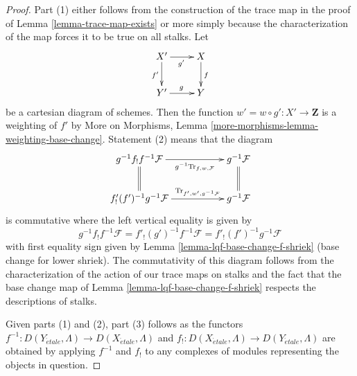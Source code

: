 \documentclass{stacks-project}
\theoremstyle{plain}
\theoremstyle{definition}
\theoremstyle{remark}
\numberwithin{equation}{subsection}
\def\etale{{\acute{e}tale}}
\begin{document}
\begin{proof}
Part (1) either follows from the construction of the trace map
in the proof of Lemma \ref{lemma-trace-map-exists}
or more simply because the characterization of the map
forces it to be true on all stalks.
Let
$$
\xymatrix{
X' \ar[r]_{g'} \ar[d]_{f'} & X \ar[d]^f \\
Y' \ar[r]^g & Y
}
$$
be a cartesian diagram of schemes. Then the function
$w' = w \circ g' : X' \to \mathbf{Z}$ is a weighting of $f'$ by
More on Morphisms, Lemma \ref{more-morphisms-lemma-weighting-base-change}.
Statement (2) means that the diagram
$$
\xymatrix{
g^{-1}f_!f^{-1}\mathcal{F}
\ar[rr]_-{g^{-1}\text{Tr}_{f, w, \mathcal{F}}} \ar@{=}[d] & &
g^{-1}\mathcal{F} \ar@{=}[d] \\
f'_!(f')^{-1}g^{-1}\mathcal{F}
\ar[rr]^-{\text{Tr}_{f', w', g^{-1}\mathcal{F}}} & &
g^{-1}\mathcal{F}
}
$$
is commutative where the left vertical equality is given by
$$
g^{-1}f_!f^{-1}\mathcal{F} =
f'_!(g')^{-1}f^{-1}\mathcal{F} =
f'_!(f')^{-1}g^{-1}\mathcal{F}
$$
with first equality sign given by Lemma \ref{lemma-lqf-base-change-f-shriek}
(base change for lower shriek). The commutativity of this diagram
follows from the characterization of the action of our trace maps
on stalks and the fact that the base change map of
Lemma \ref{lemma-lqf-base-change-f-shriek} respects the descriptions of stalks.

\medskip\noindent
Given parts (1) and (2), part (3) follows as the functors
$f^{-1} : D(Y_\etale, \Lambda) \to D(X_\etale, \Lambda)$ and
$f_! : D(X_\etale, \Lambda) \to D(Y_\etale, \Lambda)$
are obtained by applying $f^{-1}$ and $f_!$ to any complexes
of modules representing the objects in question.
\end{proof}
\end{document}
